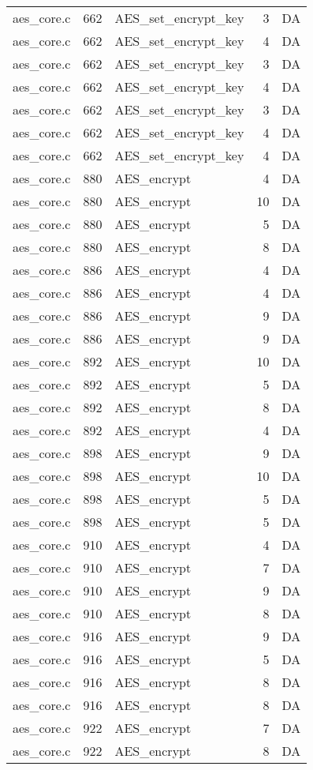\begin{table}[h!]
\begin{tabular}{lrlrr}
aes\_core.c& 662&AES\_set\_encrypt\_key&3 &DA\\
aes\_core.c& 662&AES\_set\_encrypt\_key&4 &DA\\
aes\_core.c& 662&AES\_set\_encrypt\_key&3 &DA\\
aes\_core.c& 662&AES\_set\_encrypt\_key&4 &DA\\
aes\_core.c& 662&AES\_set\_encrypt\_key&3 &DA\\
aes\_core.c& 662&AES\_set\_encrypt\_key&4 &DA\\
aes\_core.c& 662&AES\_set\_encrypt\_key&4 &DA\\
aes\_core.c& 880&AES\_encrypt&4 &DA\\
aes\_core.c& 880&AES\_encrypt&10&DA\\
aes\_core.c& 880&AES\_encrypt&5 &DA\\
aes\_core.c& 880&AES\_encrypt&8 &DA\\
aes\_core.c& 886&AES\_encrypt&4 &DA\\
aes\_core.c& 886&AES\_encrypt&4 &DA\\
aes\_core.c& 886&AES\_encrypt&9 &DA\\
aes\_core.c& 886&AES\_encrypt&9 &DA\\
aes\_core.c& 892&AES\_encrypt&10&DA\\
aes\_core.c& 892&AES\_encrypt&5 &DA\\
aes\_core.c& 892&AES\_encrypt&8 &DA\\
aes\_core.c& 892&AES\_encrypt&4 &DA\\
aes\_core.c& 898&AES\_encrypt&9 &DA\\
aes\_core.c& 898&AES\_encrypt&10&DA\\
aes\_core.c& 898&AES\_encrypt&5 &DA\\
aes\_core.c& 898&AES\_encrypt&5 &DA\\
aes\_core.c& 910&AES\_encrypt&4 &DA\\
aes\_core.c& 910&AES\_encrypt&7 &DA\\
aes\_core.c& 910&AES\_encrypt&9 &DA\\
aes\_core.c& 910&AES\_encrypt&8 &DA\\
aes\_core.c& 916&AES\_encrypt&9 &DA\\
aes\_core.c& 916&AES\_encrypt&5 &DA\\
aes\_core.c& 916&AES\_encrypt&8 &DA\\
aes\_core.c& 916&AES\_encrypt&8 &DA\\
aes\_core.c& 922&AES\_encrypt&7 &DA\\
aes\_core.c& 922&AES\_encrypt&8 &DA\\

\end{tabular}
\end{table}

